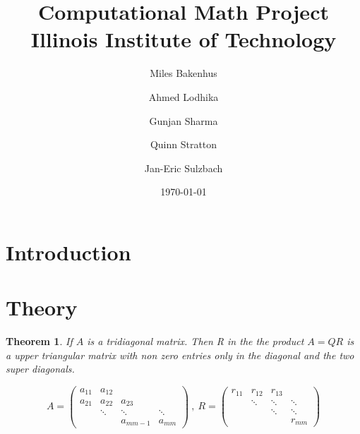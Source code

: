 \documentclass{report}
\title{Computational Math Project\\
  {\large Illinois Institute of Technology}
}
\author{
  Miles Bakenhus 
  \and
  Ahmed Lodhika 
  \and
  Gunjan Sharma 
  \and
  Quinn Stratton 
  \and
  Jan-Eric Sulzbach 
}
\date{\today}
\numberwithin{pic}{section}
\numberwithin{lem}{section}
\newtheorem{thm}{Theorem}
\numberwithin{thm}{section}
\numberwithin{cor}{section}
\theoremstyle{definition}
\numberwithin{ex}{section}
\numberwithin{defn}{section}
\theoremstyle{definition}
\theoremstyle{remark}
\begin{document}
\fancyhead[l]{}
\fancyhead[c]{}
\fancyhead[r]{}

\maketitle

\tableofcontents


\section{Introduction}

\section{Theory}
\begin{thm}
If $A$ is a tridiagonal matrix. Then R in the the product $A=QR$ is a upper triangular matrix with non zero entries only in the diagonal and the two super diagonals.
\end{thm}
\[A=\begin{pmatrix}
a_{11} & a_{12} &  &   \\ 
a_{21} & a_{22} & a_{23} &    \\ 
 & \ddots & \ddots & \ddots   \\ 
   &  & a_{m m-1} & a_{mm}
\end{pmatrix}~,~R=\begin{pmatrix}
r_{11} & r_{12} & r_{13} &  \\ 
 & \ddots & \ddots & \ddots \\ 
 &  & \ddots & \ddots \\ 
 &  &  & r_{mm}
\end{pmatrix}  \]
\end{document}
